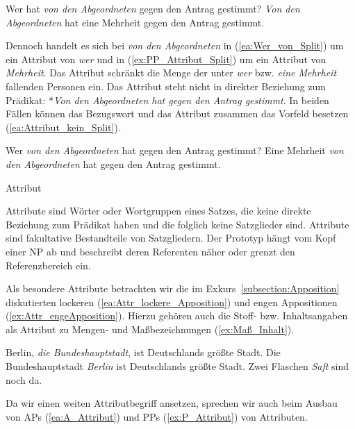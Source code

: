 \largerpage
\ea \label{ea:Attribut_Split}
\ea \label{ea:Wer_von_Split} Wer hat \textit{von den Abgeordneten} gegen den Antrag gestimmt?
\ex \label{ex:PP_Attribut_Split} \textit{Von den Abgeordneten} hat eine Mehrheit gegen den Antrag gestimmt.
\z 
\z   

Dennoch handelt es sich bei \textit{von den Abgeordneten} in (\ref{ea:Wer_von_Split}) um ein Attribut von \textit{wer} und in (\ref{ex:PP_Attribut_Split}) um ein Attribut von \textit{Mehrheit}. Das Attribut schränkt die Menge der unter \textit{wer} bzw. \textit{eine Mehrheit} fallenden Personen ein. Das Attribut steht nicht in direkter Beziehung zum Prädikat: *\textit{Von den Abgeordneten hat gegen den Antrag gestimmt}. In beiden Fällen können das Bezugswort und das Attribut zusammen das Vorfeld besetzen (\ref{ea:Attribut_kein_Split}).

\ea \label{ea:Attribut_kein_Split}
\ea \label{ea:Wer_von_PP} Wer \textit{von den Abgeordneten} hat gegen den Antrag gestimmt?
\ex \label{ex:Mehrheit_von_PP} Eine Mehrheit \textit{von den Abgeordneten} hat gegen den Antrag gestimmt.
\z 
\z   


\begin{Definition}{Attribut}
    
\noindent Attribute sind Wörter oder Wortgruppen eines Satzes, die keine direkte Beziehung zum Prädikat haben und die folglich keine Satzglieder sind. Attribute sind fakultative Bestandteile von Satzgliedern. Der Prototyp hängt vom Kopf einer NP ab und beschreibt deren Referenten näher oder grenzt den Referenzbereich ein.    
\end{Definition}




Als besondere Attribute betrachten wir die im Exkurs~\ref{subsection:Apposition} diskutierten lockeren (\ref{ea:Attr_lockere_Apposition}) und engen Appositionen (\ref{ex:Attr_engeApposition}). Hierzu gehören auch die Stoff- bzw. Inhaltsangaben als Attribut zu Mengen- und Maßbezeichnungen (\ref{ex:Maß_Inhalt}). 

\ea \label{ea:NAttribut_Apposition}
\ea \label{ea:Attr_lockere_Apposition} Berlin, \textit{die Bundeshauptstadt}, ist Deutschlands größte Stadt.
\ex \label{ex:Attr_engeApposition} Die Bundeshauptstadt \textit{Berlin} ist Deutschlands größte Stadt.
\ex \label{ex:Maß_Inhalt} Zwei Flaschen \textit{Saft} sind noch da.
\z 
\z 

Da wir einen weiten Attributbegriff ansetzen, sprechen wir auch beim Ausbau von APs (\ref{ea:A_Attribut}) und PPs (\ref{ex:P_Attribut}) von Attributen. 

